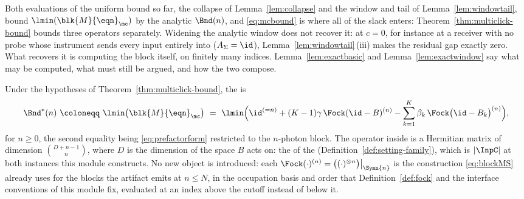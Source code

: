 
Both evaluations of the uniform bound so far, the collapse of
Lemma~\ref{lem:collapse} and the window and tail of
Lemma~\ref{lem:windowtail}, bound $\lmin(\blk{M}{\eqn}_{\mc})$ by the
analytic $\Bnd(n)$, and \eqref{eq:mcbound} is where all of the slack enters:
Theorem~\ref{thm:multiclick-bound} bounds three operators separately. Widening the
analytic window does not recover it: at $c=0$, for instance at a receiver
with no probe whose instrument sends every input entirely into
 ($A_\Sigma=\id$), Lemma~\ref{lem:windowtail}\,(iii) makes the residual
gap exactly zero. What recovers it is computing the block itself, on finitely
many indices. Lemma~\ref{lem:exactbasic} and Lemma~\ref{lem:exactwindow} say
what may be computed, what must still be argued, and how the two compose.

\begin{definition}\label{def:exactbnd}
Under the hypotheses of Theorem~\ref{thm:multiclick-bound}, the
is
\begin{equation}\label{eq:exactbnd}
  \Bnd^{\ast}(n)\ \coloneqq\ \lmin\big(\blk{M}{\eqn}_{\mc}\big)
  \ =\ \lmin\Big(\id^{(=n)}+(K-1)\gamma\,\Fock(\id-B)^{(n)}
   -\sum_{k=1}^{K}\beta_k\,\Fock\big(\id-B_k\big)^{(n)}\Big),
\end{equation}
for $n\ge0$, the second equality being \eqref{eq:prefactorform} restricted to
the $n$-photon block. The operator inside is a Hermitian matrix of dimension
$\binom{D+n-1}{n}$, where $D$ is the dimension of the space $B$ acts on:
the  of the 
(Definition~\ref{def:setting-family}), which is $|\InpC|$ at both instances
this module constructs. No new object is introduced: each
$\Fock(\cdot)^{(n)}=\big((\cdot)^{\otimes n}\big)\big|_{\Symn{n}}$ is the
construction \eqref{eq:blockMS} already uses for the blocks the artifact
emits at $n\le N$, in the occupation basis and order that
Definition~\ref{def:fock} and the interface conventions of this module fix,
evaluated at an index above the cutoff instead of below it.
\end{definition}
